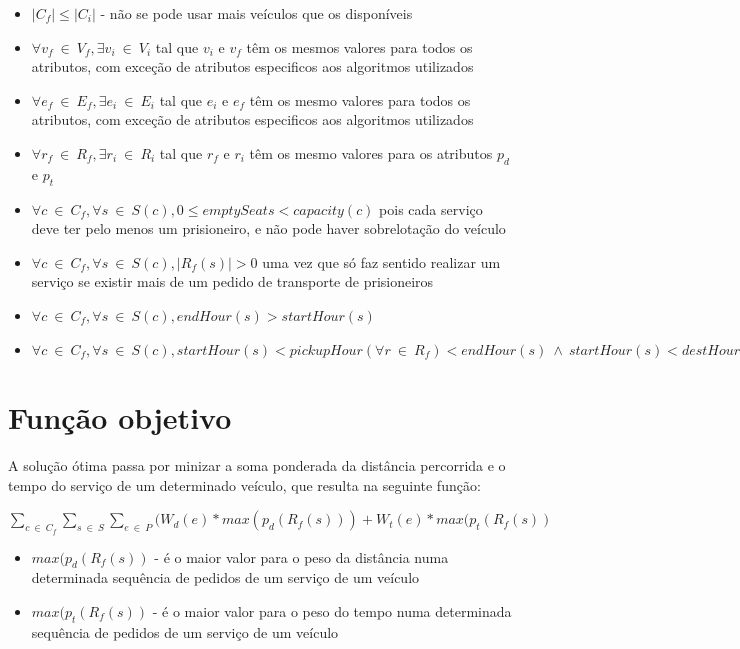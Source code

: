 \documentclass[article, a4paper, 12pt, oneside]{memoir}
\begin{document}
\begin{itemize}
	\item $\vert C_f \vert \leq \vert C_i \vert $ - não se pode usar mais veículos que os disponíveis
	\item $\forall v_f ~ \in ~ V_f, \exists v_i ~ \in ~ V_i$ tal que $v_i$ e $v_f$ têm os mesmos valores para todos os atributos, com exceção de atributos especificos aos algoritmos utilizados
	\item $\forall e_f ~ \in ~ E_f, \exists e_i ~ \in ~ E_i$ tal que $e_i$ e $e_f$ têm os mesmo valores para todos os atributos, com exceção de atributos especificos aos algoritmos utilizados
	\item $\forall r_f ~ \in ~ R_f, \exists r_i ~ \in ~ R_i$ tal que $r_f$ e $r_i$ têm os mesmo valores para os atributos $p_d$ e $p_t$
	\item $\forall c ~ \in ~ C_f, \forall s ~ \in ~ S(c), 0 \leq emptySeats < capacity(c)$ pois cada serviço deve ter pelo menos um prisioneiro, e não pode haver sobrelotação do veículo
	\item $\forall c ~ \in ~ C_f, \forall s ~ \in ~ S(c), \vert R_f(s) \vert > 0$ uma vez que só faz sentido realizar um serviço se existir mais de um pedido de transporte de prisioneiros
	\item $\forall c ~ \in ~ C_f, \forall s ~ \in ~ S(c), endHour(s) > startHour(s)$
	\item $\forall c ~ \in ~ C_f, \forall s ~ \in ~ S(c), startHour(s) < pickupHour(\forall r ~ \in ~ R_f) < endHour(s) ~ \wedge ~ startHour(s) < destHour(\forall r ~ \in ~ R_f) \leq endHour(s)$
\end{itemize}

\section{Função objetivo}

A solução ótima passa por minizar a soma ponderada da distância percorrida e o tempo do serviço de um determinado veículo, que resulta na seguinte função:

$\sum_{c ~ \in ~ C_f} \sum_{s ~ \in ~ S} \sum_{e ~ \in ~ P} (W_d(e) * max(p_d(R_f(s))) + W_t(e) * max(p_t(R_f(s))$

\begin{itemize}
	\item $max(p_d(R_f(s))$ - é o maior valor para o peso da distância numa determinada sequência de pedidos de um serviço de um veículo 
	\item $max(p_t(R_f(s))$ - é o maior valor para o peso do tempo numa determinada sequência de pedidos de um serviço de um veículo
\end{itemize}
\end{document}
